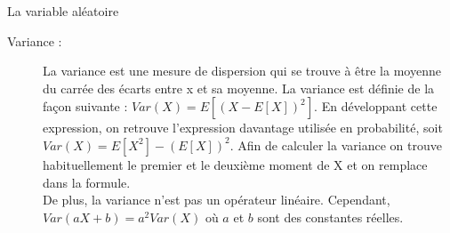 \documentclass[10pt, french]{article}
\begin{document}
\begin{multicols*}{3}
\begin{probch4}{La variable aléatoire}
\begin{description}
	\item[Variance :] La variance est une mesure de dispersion qui se trouve à être la moyenne du carrée des écarts entre x et sa moyenne. La variance est définie de la façon suivante : $ Var(X) = E[(X - E[X])^2]$. En développant cette \\ 
	expression, on retrouve l'expression davantage utilisée en probabilité, soit $Var(X) = E[X^2] - (E[X])^2$.  Afin de calculer la variance on trouve habituellement le premier et le deuxième moment de X et on remplace dans la formule. \\
	De plus, la variance n'est pas un opérateur linéaire. Cependant, $Var(aX + b) = a^2 Var(X)$ où $a$ et $b$ sont des constantes réelles.
\end{description}
\end{probch4}
\end{multicols*}
\end{document}
